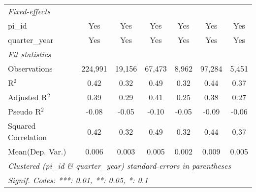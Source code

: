 \begin{tabular}{lcccccc}
   \emph{Fixed-effects}\\
   pi\_id                                                     & Yes            & Yes           & Yes            & Yes        & Yes             & Yes\\  
   quarter\_year                                              & Yes            & Yes           & Yes            & Yes        & Yes             & Yes\\  
   \midrule
   \emph{Fit statistics}\\
   Observations                                               & 224,991        & 19,156        & 67,473         & 8,962      & 97,284          & 5,451\\  
   R$^2$                                                      & 0.42           & 0.32          & 0.49           & 0.32       & 0.44            & 0.37\\  
   Adjusted R$^2$                                             & 0.39           & 0.29          & 0.41           & 0.25       & 0.38            & 0.27\\  
   Pseudo R$^2$                                               & -0.08          & -0.05         & -0.10          & -0.05      & -0.09           & -0.06\\  
   Squared Correlation                                        & 0.42           & 0.32          & 0.49           & 0.32       & 0.44            & 0.37\\  
Mean(Dep. Var.) & 0.006 & 0.003 & 0.005 & 0.002 & 0.009 & 0.005 \\
   \midrule \midrule
   \multicolumn{7}{l}{\emph{Clustered (pi\_id \& quarter\_year) standard-errors in parentheses}}\\
   \multicolumn{7}{l}{\emph{Signif. Codes: ***: 0.01, **: 0.05, *: 0.1}}\\
\end{tabular}
\par\endgroup
